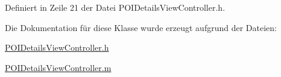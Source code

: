 Definiert in Zeile 21 der Datei POIDetailsViewController.h.

Die Dokumentation für diese Klasse wurde erzeugt aufgrund der Dateien:\begin{DoxyCompactItemize}
\item 
\hyperlink{_p_o_i_details_view_controller_8h}{POIDetailsViewController.h}\item 
\hyperlink{_p_o_i_details_view_controller_8m}{POIDetailsViewController.m}\end{DoxyCompactItemize}
